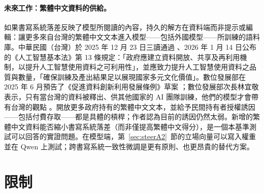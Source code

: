\documentclass[11pt,a4paper]{article}
\begin{document}
\paragraph{未來工作：繁體中文資料的供給。}
如果書寫系統落差反映了模型所閱讀的內容，持久的解方在資料端而非提示或編輯：讓更多來自台灣的繁體中文文本進入模型——包括外國模型——所訓練的語料庫。中華民國（台灣）於 2025 年 12 月 23 日三讀通過 \citep{technews2025aibasic}、2026 年 1 月 14 日公布的《人工智慧基本法》第 13 條規定：「政府應建立資料開放、共享及再利用機制，以提升人工智慧使用資料之可利用性」，並應致力提升人工智慧使用資料之品質與數量，「確保訓練及產出結果足以展現國家多元文化價值」\citep{roc2026aibasic}。數位發展部在 2025 年 6 月預告了《促進資料創新利用發展條例》草案 \citep{ltn2025modadraft}；數位發展部次長林宜敬表示，只有當台灣的資料被釋出、供其他國家的 AI 團隊訓練，他們的模型才會帶有台灣的觀點 \citep{pts2025moda}。開放更多政府持有的繁體中文文本，並給予民間持有者授權誘因——包括付費存取——都是具體的槓桿；作者認為目前的誘因仍然太弱。新增的繁體中文資料能否縮小書寫系統落差（而非僅提高繁體中文得分），是一個本基準測試可以回答的實證問題。在模型端，第~\ref{sec:steerA2}~節的立場向量可以寫入權重並在 Qwen 上測試；跨書寫系統一致性微調是更有原則、也更昂貴的替代方案。

\section{限制}\label{sec:limits}
\end{document}
